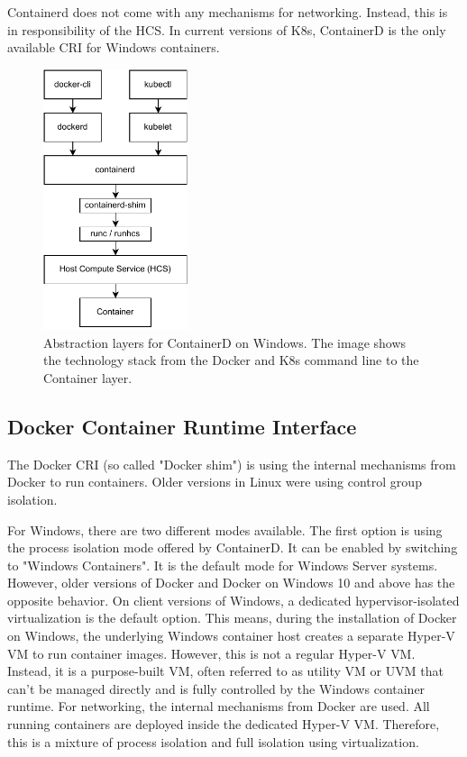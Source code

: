 Containerd does not come with any mechanisms for networking. Instead, this is in responsibility of the \ac{HCS}. In current versions of \ac{K8s}, ContainerD is the only available \ac{CRI} for \ac{Windows} containers.

\begin{figure}[h]
	\centering
	\includegraphics[width=0.38\textwidth]{Figures/containerd-architecture.pdf}
	\caption{Abstraction layers for ContainerD on Windows. The image shows the technology stack from the Docker and \ac{K8s} command line to the Container layer.\cite{Scooley.2022}}
	\label{fig.containerd-architecture}
\end{figure}


\subsection{Docker Container Runtime Interface}
The Docker \ac{CRI} (so called "Docker shim") is using the internal mechanisms from Docker to run containers. Older versions in Linux were using control group isolation.

For \ac{Windows}, there are two different modes available. The first option is using the process isolation mode offered by ContainerD. It can be enabled by switching to "\ac{Windows} Containers". It is the default mode for Windows Server systems. However, older versions of Docker and Docker on Windows 10 and above has the opposite behavior\cite{RamosApolinario.2021}. On client versions of Windows, a dedicated hypervisor-isolated virtualization is the default option\cite{RamosApolinario.2021}. This means, during the installation of Docker on \ac{Windows}, the underlying Windows container host creates a separate Hyper-V \ac{VM} to run container images. However, this is not a regular Hyper-V \ac{VM}. Instead, it is a purpose-built \ac{VM}, often referred to as utility \ac{VM} or UVM that can't be managed directly and is fully controlled by the \ac{Windows} container runtime\cite{RamosApolinario.2021}. For networking, the internal mechanisms from Docker are used. All running containers are deployed inside the dedicated Hyper-V \ac{VM}. Therefore, this is a mixture of process isolation and full isolation using virtualization.

